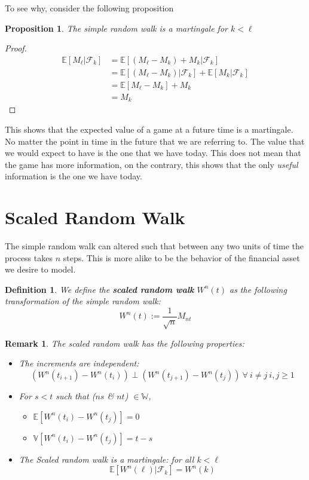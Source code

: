 \documentclass[11pt]{report}
\newtheorem{definition}{Definition}[chapter]
\newtheorem{remark}{Remark}[chapter]
\newtheorem{proposition}{Proposition}[chapter]
\begin{document}
To see why, consider the following proposition

\begin{proposition}
	The simple random walk is a martingale for $k < \ell$
\end{proposition}

\begin{proof}
	\begin{align*}
				\mathbb{E}[M_\ell|\mathscr{F}_k] &= \mathbb{E}[(M_\ell - M_k) + M_k | \mathscr{F}_k] \\
				&= \mathbb{E}[(M_\ell - M_k) | \mathscr{F}_k] + \mathbb{E}[M_k | \mathscr{F}_k] \\
				&= \mathbb{E}[M_\ell - M_k] + M_k\\
				&= M_k
	\end{align*}
\end{proof}

This shows that the expected value of a game at a future time is a martingale. No matter the point in time in the future that we are referring to. The value that we would expect to have is the one that we have today. This does not mean that the game has more information, on the contrary, this shows that the only \textit{useful} information is the one we have today. \\


\section{Scaled Random Walk}
The simple random walk can altered such that between any two units of time the process takes $n$ steps. This is more alike to be the behavior of the financial asset we desire to model. 

\begin{definition}
	We define the \textbf{scaled random walk} $W^n(t)$ as the following transformation of the simple random walk:
	\[W^n(t) := \frac{1}{\sqrt{n}}M_{nt}\]
\end{definition}

\begin{remark}
	The scaled random walk has the following properties:
	\begin{itemize}
		\item The increments are independent: \[\left(W^n(t_{i+1}) - W^n(t_{i})\right) \perp \left(W^n(t_{j+1}) - W^n(t_{j})\right) \ \forall \ i \neq j \ i, j \geq 1\]
		\item For $s < t$ such that ($ns$ \& $nt$) $\in \mathbb{W}$, 
		\begin{itemize}
			\item $\mathbb{E}[W^n(t_{i}) - W^n(t_{j})] = 0$ 
			\item $\mathbb{V}[W^n(t_{i}) - W^n(t_{j})] = t - s$
		\end{itemize}
		\item The Scaled random walk is a martingale: for all $k < \ell$
		\[\mathbb{E}[W^n(\ell) | \mathscr{F}_k] = W^n(k)\]
	\end{itemize}
\end{remark}
\end{document}
